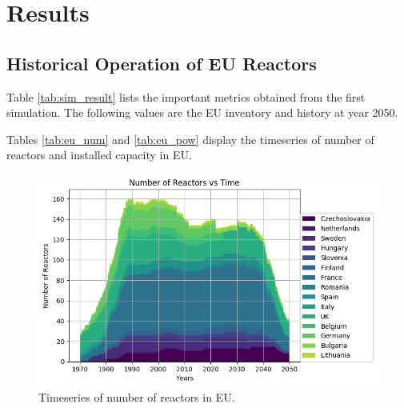 \section{Results}

\subsection{Historical Operation of \gls{EU} Reactors}


\begin{table}[h]
	\centering
		\caption{Simulation Results}
		\label{tab:sim_result}
		\end {table}

Table \ref{tab:sim_result} lists the important metrics
obtained from the first simulation. The following
values are the \gls{EU} inventory and history at year 2050.

Tables \ref{tab:eu_num} and \ref{tab:eu_pow} display the
timeseries of number of reactors and installed capacity in \gls{EU}.



\begin{figure}[htbp!]
	\begin{center}
		\includegraphics[scale=0.7]{./images/eu_future/number_plot.png}
	\end{center}
	\caption{Timeseries of number of reactors in \gls{EU}.}
	\label{fig:eu_num}
\end{figure}

